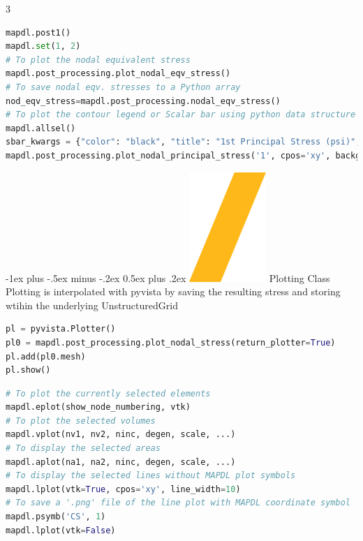 \documentclass[9pt,landscape]{article}
\makeatletter
\renewcommand{\section}{\@startsection{section}{1}{0mm}%
                                {-1ex plus -.5ex minus -.2ex}%
                                {0.5ex plus .2ex}%
                                {\normalfont\large\bfseries}}
\makeatother
\begin{document}
\begin{multicols}{3}
\begin{lstlisting}[language=Python]
mapdl.post1()
mapdl.set(1, 2)
# To plot the nodal equivalent stress
mapdl.post_processing.plot_nodal_eqv_stress()
# To save nodal eqv. stresses to a Python array
nod_eqv_stress=mapdl.post_processing.nodal_eqv_stress()
# To plot the contour legend or Scalar bar using python data structure dictionary
mapdl.allsel()
sbar_kwargs = {"color": "black", "title": "1st Principal Stress (psi)", "vertical": False, "n_labels": 6}
mapdl.post_processing.plot_nodal_principal_stress('1', cpos='xy', background='white', edge_color='black', show_edges=True, scalar bar_args=sbar_kwargs, n_colors=9)
\end{lstlisting}
\vfill
\section{\includegraphics[height=\fontcharht\font`\S]{slash.png} Plotting Class}
Plotting is interpolated with pyvista by saving the resulting stress and storing wtihin the underlying UnstructuredGrid
\begin{lstlisting}[language=Python]
pl = pyvista.Plotter()
pl0 = mapdl.post_processing.plot_nodal_stress(return_plotter=True)
pl.add(pl0.mesh)
pl.show()
\end{lstlisting}
\begin{lstlisting}[language=Python]
# To plot the currently selected elements
mapdl.eplot(show_node_numbering, vtk)
# To plot the selected volumes
mapdl.vplot(nv1, nv2, ninc, degen, scale, ...)
# To display the selected areas
mapdl.aplot(na1, na2, ninc, degen, scale, ...)
# To display the selected lines without MAPDL plot symbols
mapdl.lplot(vtk=True, cpos='xy', line_width=10)
# To save a '.png' file of the line plot with MAPDL coordinate symbol
mapdl.psymb('CS', 1)
mapdl.lplot(vtk=False)
\end{lstlisting}
\vfill

\end{multicols}
\end{document}
